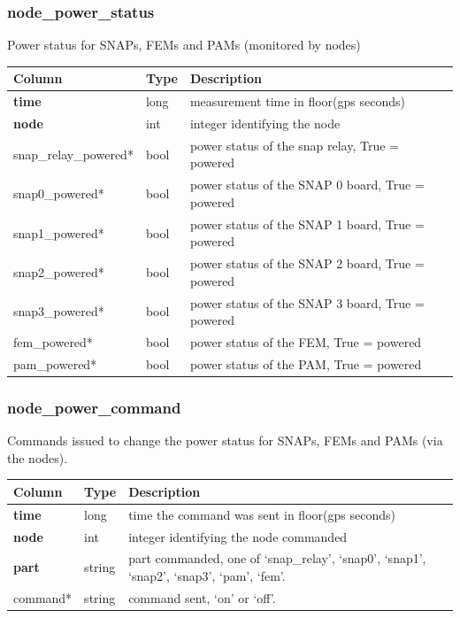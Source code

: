 \documentclass{article}
\begin{document}
{\subsubsection{node\_power\_status}
Power status for SNAPs, FEMs and PAMs (monitored by nodes)
\begin{center}
 \begin{tabular}{| p{4cm} | p{2cm} | p{10cm} |}
\hline
 {\bf Column} & {\bf Type}  & {\bf Description} \\ [0.5ex]  \hline\hline
\textbf{time} & long & measurement time in floor(gps seconds)\\ \hline
\textbf{node} & int & integer identifying the node \\ \hline
snap\_relay\_powered* & bool & power status of the snap relay, True = powered \\\hline
snap0\_powered* & bool & power status of the SNAP 0 board, True = powered \\\hline
snap1\_powered* & bool & power status of the SNAP 1 board, True = powered \\\hline
snap2\_powered* & bool & power status of the SNAP 2 board, True = powered \\\hline
snap3\_powered* & bool & power status of the SNAP 3 board, True = powered \\\hline
fem\_powered* & bool & power status of the FEM, True = powered \\\hline
pam\_powered* & bool & power status of the PAM, True = powered \\\hline
\end{tabular}
\end{center}

\subsubsection{node\_power\_command}
Commands issued to change the power status for SNAPs, FEMs and PAMs (via the nodes).
\begin{center}
 \begin{tabular}{| p{4cm} | p{2cm} | p{10cm} |}
\hline
 {\bf Column} & {\bf Type}  & {\bf Description} \\ [0.5ex]  \hline\hline
\textbf{time} & long & time the command was sent in floor(gps seconds)\\ \hline
\textbf{node} & int & integer identifying the node commanded \\ \hline
\textbf{part} & string & part commanded, one of `snap\_relay', `snap0', `snap1', `snap2', `snap3', `pam', `fem'. \\ \hline
command* & string & command sent, `on' or `off'. \\\hline
\end{tabular}
\end{center}

}
\end{document}
